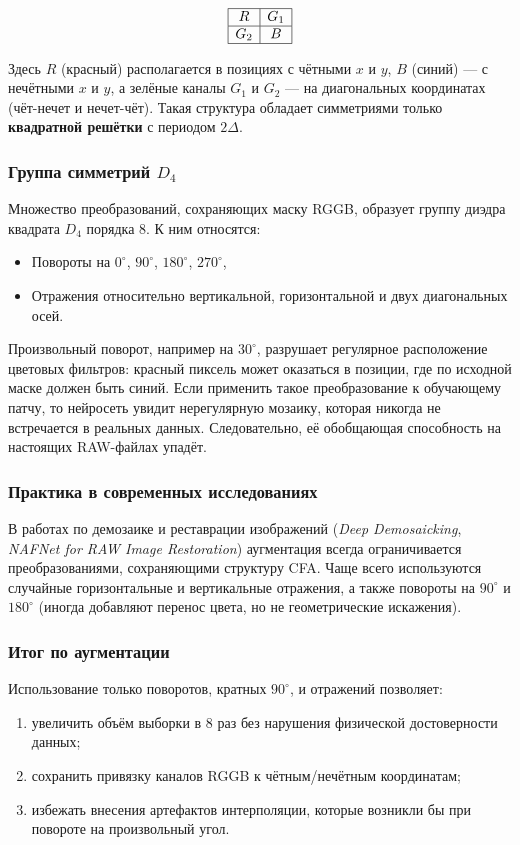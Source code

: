 \documentclass[12pt,a4paper]{article}
\begin{document}
\[
\begin{array}{|c|c|}
\hline
R & G_1 \\
\hline
G_2 & B \\
\hline
\end{array}
\]

Здесь $R$ (красный) располагается в позициях с чётными $x$ и $y$, $B$ (синий) — с нечётными $x$ и $y$, а зелёные каналы $G_1$ и $G_2$ — на диагональных координатах (чёт-нечет и нечет-чёт). Такая структура обладает симметриями только \textbf{квадратной решётки} с периодом $2\Delta$.

\subsubsection{Группа симметрий $D_4$}
Множество преобразований, сохраняющих маску RGGB, образует группу диэдра квадрата $D_4$ порядка $8$. К ним относятся:
\begin{itemize}
    \item Повороты на $0^\circ$, $90^\circ$, $180^\circ$, $270^\circ$,
    \item Отражения относительно вертикальной, горизонтальной и двух диагональных осей.
\end{itemize}
Произвольный поворот, например на $30^\circ$, разрушает регулярное расположение цветовых фильтров: красный пиксель может оказаться в позиции, где по исходной маске должен быть синий. Если применить такое преобразование к обучающему патчу, то нейросеть увидит нерегулярную мозаику, которая никогда не встречается в реальных данных. Следовательно, её обобщающая способность на настоящих RAW-файлах упадёт.

\subsubsection{Практика в современных исследованиях}
В работах по демозаике и реставрации изображений (\textit{Deep Demosaicking}, \textit{NAFNet for RAW Image Restoration}) аугментация всегда ограничивается преобразованиями, сохраняющими структуру CFA. Чаще всего используются случайные горизонтальные и вертикальные отражения, а также повороты на $90^\circ$ и $180^\circ$ (иногда добавляют перенос цвета, но не геометрические искажения).

\subsubsection{Итог по аугментации}
Использование только поворотов, кратных $90^\circ$, и отражений позволяет:
\begin{enumerate}
    \item увеличить объём выборки в $8$ раз без нарушения физической достоверности данных;
    \item сохранить привязку каналов RGGB к чётным/нечётным координатам;
    \item избежать внесения артефактов интерполяции, которые возникли бы при повороте на произвольный угол.
\end{enumerate}
\end{document}

